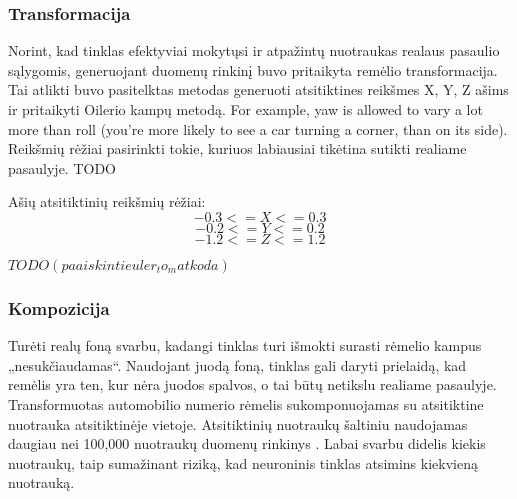 \documentclass{VUMIFPSkursinis}
\begin{document}
\subsubsection{Transformacija}

Norint, kad tinklas efektyviai mokytųsi ir atpažintų nuotraukas realaus pasaulio sąlygomis, generuojant duomenų
rinkinį buvo pritaikyta remėlio transformacija. Tai atlikti buvo pasitelktas metodas generuoti atsitiktines
reikšmes X, Y, Z ašims ir pritaikyti Oilerio kampų metodą. \cite{slabaugh1999computing}
For example, yaw is allowed to vary a lot more than roll (you’re more likely to see a car turning a corner, than on its side).
Reikšmių rėžiai pasirinkti tokie, kuriuos labiausiai tikėtina sutikti realiame pasaulyje.
TODO

Ašių atsitiktinių reikšmių rėžiai:
\begin{equation}
  -0.3 <= X <= 0.3
\end{equation}
\begin{equation}
  -0.2 <= Y <= 0.2
\end{equation}
\begin{equation}
  -1.2 <= Z <= 1.2
\end{equation}

$TODO (paaiskinti euler_to_mat koda)$

\subsubsection{Kompozicija}
Turėti realų foną svarbu, kadangi tinklas turi išmokti surasti rėmelio kampus „nesukčiaudamas“. 
Naudojant juodą foną, tinklas gali daryti prielaidą, kad remėlis yra ten, kur nėra juodos spalvos, o tai būtų netikslu realiame pasaulyje.
Transformuotas automobilio numerio rėmelis sukomponuojamas su atsitiktine nuotrauka atsitiktinėje vietoje.
Atsitiktinių nuotraukų šaltiniu naudojamas daugiau nei 100,000 nuotraukų duomenų rinkinys \cite{xiao2010sun}.
Labai svarbu didelis kiekis nuotraukų, taip sumažinant riziką, kad neuroninis tinklas atsimins kiekvieną nuotrauką.
\end{document}

